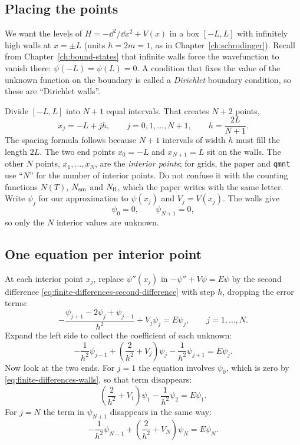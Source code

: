 \subsection{Placing the points}

We want the levels of $H=-\dd^2/\dd x^2+V(x)$ in a box $[-L,L]$ with infinitely high walls at $x=\pm L$ (units $\hbar=2m=1$, as in Chapter~\ref{ch:schrodinger}). Recall from Chapter~\ref{ch:bound-states} that infinite walls force the wavefunction to vanish there: $\psi(-L)=\psi(L)=0$. A condition that fixes the value of the unknown function on the boundary is called a \emph{Dirichlet} boundary condition, so these are ``Dirichlet walls''.

Divide $[-L,L]$ into $N+1$ equal intervals. That creates $N+2$ points,
\begin{equation}
x_j=-L+jh,\qquad j=0,1,\dots,N+1,\qquad h=\frac{2L}{N+1}.
\label{eq:finite-differences-grid}
\end{equation}
The spacing formula follows because $N+1$ intervals of width $h$ must fill the length $2L$. The two end points $x_0=-L$ and $x_{N+1}=L$ sit on the walls. The other $N$ points, $x_1,\dots,x_N$, are the \emph{interior points}; for grids, the paper and \texttt{qmnt} use ``$N$'' for the number of interior points. Do not confuse it with the counting functions $N(T)$, $N_{\mathrm{sm}}$ and $N_{\mathrm{fl}}$, which the paper writes with the same letter. Write $\psi_j$ for our approximation to $\psi(x_j)$ and $V_j=V(x_j)$. The walls give
\begin{equation}
\psi_0=0,\qquad \psi_{N+1}=0,
\label{eq:finite-differences-walls}
\end{equation}
so only the $N$ interior values are unknown.

\subsection{One equation per interior point}

At each interior point $x_j$, replace $\psi''(x_j)$ in $-\psi''+V\psi=E\psi$ by the second difference \eqref{eq:finite-differences-second-difference} with step $h$, dropping the error terms:
\begin{equation}
-\frac{\psi_{j+1}-2\psi_j+\psi_{j-1}}{h^2}+V_j\psi_j=E\psi_j,\qquad j=1,\dots,N.
\label{eq:finite-differences-discrete-eq}
\end{equation}
Expand the left side to collect the coefficient of each unknown:
\begin{equation}
-\frac{1}{h^2}\psi_{j-1}+\left(\frac{2}{h^2}+V_j\right)\psi_j-\frac{1}{h^2}\psi_{j+1}=E\psi_j.
\label{eq:finite-differences-row}
\end{equation}
Now look at the two ends. For $j=1$ the equation involves $\psi_0$, which is zero by \eqref{eq:finite-differences-walls}, so that term disappears:
\begin{equation*}
\left(\frac{2}{h^2}+V_1\right)\psi_1-\frac{1}{h^2}\psi_2=E\psi_1.
\end{equation*}
For $j=N$ the term in $\psi_{N+1}$ disappears in the same way:
\begin{equation*}
-\frac{1}{h^2}\psi_{N-1}+\left(\frac{2}{h^2}+V_N\right)\psi_N=E\psi_N.
\end{equation*}

